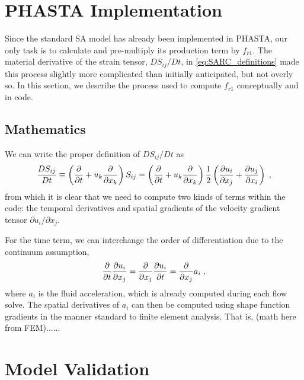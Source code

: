 \documentclass[11pt]{article}
\begin{document}
\section{PHASTA Implementation} %

Since the standard SA model has already been implemented in PHASTA, our only task is to calculate and pre-multiply its production term by $f_{r1}$. The material derivative of the strain tensor, $DS_{ij}/Dt$, in \eqref{eq:SARC_definitions} made this process slightly more complicated than initially anticipated, but not overly so. In this section, we describe the process used to compute $f_{r1}$ conceptually and in code.

\subsection{Mathematics}

We can write the proper definition of $DS_{ij}/Dt$ as
\begin{equation}
\frac{DS_{ij}}{Dt}
\equiv
\left( \frac{\partial}{\partial t} + u_k \frac{\partial}{\partial x_k} \right) S_{ij}
=
\left( \frac{\partial}{\partial t} + u_k \frac{\partial}{\partial x_k} \right)
\frac{1}{2} \left( \frac{\partial u_i}{\partial x_j} + \frac{\partial u_j}{\partial x_i} \right)
\;,
\end{equation}
from which it is clear that we need to compute two kinds of terms within the code: the temporal derivatives and spatial gradients of the velocity gradient tensor $\partial u_i / \partial x_j$.

For the time term, we can interchange the order of differentiation due to the continuum assumption,
\begin{equation}
\frac{\partial}{\partial t} \frac{\partial u_i}{\partial x_j}
=
\frac{\partial}{\partial x_j} \frac{\partial u_i}{\partial t}
=
\frac{\partial}{\partial x_j} a_i
\;,
\end{equation}
where $a_i$ is the fluid acceleration, which is already computed during each flow solve. The spatial derivatives of $a_i$ can then be computed using shape function gradients in the manner standard to finite element analysis. That is, (math here from FEM)......

\section{Model Validation} %
\end{document}
